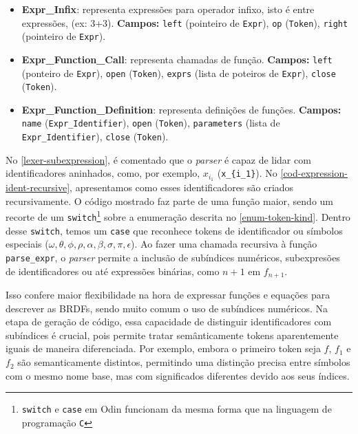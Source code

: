 \begin{itemize}
  \item \textbf{Expr\_Infix}: representa expressões para operador infixo, isto é entre expressões, (ex: 3+3).
      \textbf{Campos:}
        \texttt{left} (pointeiro de \texttt{Expr}), \texttt{op} (\texttt{Token}), \texttt{right} (pointeiro de \texttt{Expr}).

\item \textbf{Expr\_Function\_Call}: representa chamadas de função.
      \textbf{Campos:}
      \texttt{left} (ponteiro de \texttt{Expr}), \texttt{open} (\texttt{Token}),
      \texttt{exprs} (lista de poteiros de \texttt{Expr}), \texttt{close} (\texttt{Token}).

\item \textbf{Expr\_Function\_Definition}: representa definições de funções.
      \textbf{Campos:}
      \texttt{name} (\texttt{Expr\_Identifier}), \texttt{open} (\texttt{Token}),
      \texttt{parameters} (lista de \texttt{Expr\_Identifier}), \texttt{close} (\texttt{Token}).
\end{itemize}




No \autoref{lexer-subexpression}, é comentado que o \textit{parser} é capaz de lidar com identificadores aninhados, como, por exemplo, \( x_{i_1} \) (\verb"x_{i_1}"). No \autoref{cod-expression-ident-recursive}, apresentamos como esses identificadores são criados recursivamente. O código mostrado faz parte de uma função maior, sendo um recorte de um \texttt{switch}\footnote{\texttt{switch} e \texttt{case} em Odin funcionam da mesma forma que na linguagem de programação \texttt{C}} sobre a enumeração descrita no \autoref{enum-token-kind}. Dentro desse \texttt{switch}, temos um \texttt{case} que reconhece tokens de identificador ou símbolos especiais (\( \omega, \theta, \phi, \rho, \alpha, \beta, \sigma, \pi, \epsilon \)). Ao fazer uma chamada recursiva à função \texttt{parse\_expr}, o \textit{parser} permite a inclusão de subíndices numéricos, subexpresões de identificadores ou até expressões binárias, como \( n+1 \) em \( f_{n+1} \).

Isso confere maior flexibilidade na hora de expressar funções e equações para descrever as BRDFs, sendo muito comum o uso de subíndices numéricos. Na etapa de geração de código, essa capacidade de distinguir identificadores com subíndices é crucial, pois permite tratar semânticamente tokens aparentemente iguais de maneira diferenciada. Por exemplo, embora o primeiro token seja \( f \), \( f_1 \) e \( f_2 \) são semanticamente distintos, permitindo uma distinção precisa entre símbolos com o mesmo nome base, mas com significados diferentes devido aos seus índices.


